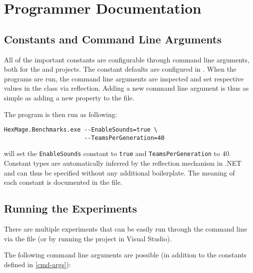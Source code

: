 \chapter{Programmer Documentation}

\section{Constants and Command Line Arguments}
\label{cmd-args}

All of the important constants are configurable through command line arguments, both for the  and  projects. The constant defaults are configured in . When the programs are run, the command line arguments are inspected and set respective values in the  class via reflection. Adding a new command line argument is thus as simple as adding a new property to the  file.

The program is then run as following:

\begin{verbatim}
HexMage.Benchmarks.exe --EnableSounds=true \
                       --TeamsPerGeneration=40
\end{verbatim}

will set the \verb|EnableSounds| constant to \verb|true| and \verb|TeamsPerGeneration| to $40$. Constant types are automatically inferred by the reflection mechanism in .NET and can thus be specified without any additional boilerplate. The meaning of each constant is documented in the  file. 

\section{Running the Experiments}

There are multiple experiments that can be easily run through the command line via the  file (or by running the  project in Visual Studio).

The following command line arguments are possible (in addition to the constants defined in \autoref{cmd-args}):

